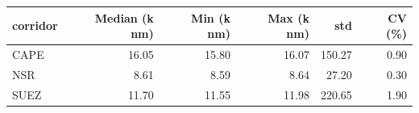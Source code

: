 \begin{tabular}{lrrrrr}
\toprule
corridor &  Median (k nm) &  Min (k nm) &  Max (k nm) &    std &  CV (\%) \\
\midrule
CAPE & 16.05 & 15.80 & 16.07 & 150.27 & 0.90 \\
NSR  &  8.61 &  8.59 &  8.64 &  27.20 & 0.30 \\
SUEZ & 11.70 & 11.55 & 11.98 & 220.65 & 1.90 \\
\bottomrule
\end{tabular}